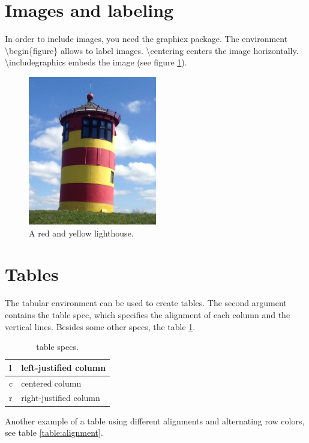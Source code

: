 \section{Images and labeling}
In order to include images, you need the graphicx package. The environment \textbackslash begin\{figure\} allows to label images. \textbackslash centering centers the image horizontally. \textbackslash includegraphics embeds the image (see figure \ref{fig:lighthouse}). 

\begin{figure}[h]
\centering
\includegraphics[width=0.5\textwidth]{img/lighthouse.jpg}
\caption{A red and yellow lighthouse.}
\label{fig:lighthouse}
\end{figure}

\section{Tables}
The tabular environment can be used to create tables. The second argument contains the table spec, which specifies the alignment of each column and the vertical lines. Besides some other specs, the table \ref{table:specs}.

\begin{table}[h]
\centering
\begin{tabular}{| l | l |}
\hline
l & left-justified column \\ \hline
c & centered column \\ \hline
r & right-justified column\\ 
\hline
\end{tabular}
\caption{table specs.}
\label{table:specs}
\end{table}

Another example of a table using different alignments and alternating row colors, see table \ref{table:alignment}. 


